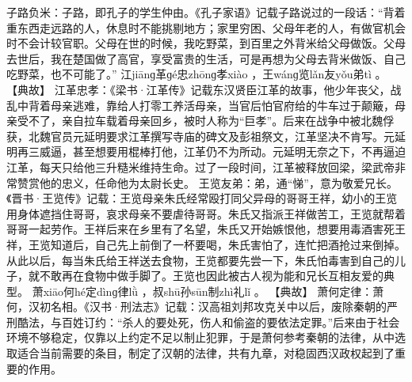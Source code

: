 \documentclass[12pt,UTF8]{ctexbook}
\begin{document}
子路负米：子路，即孔子的学生仲由。《孔子家语》记载子路说过的一段话：“背着重东西走远路的人，休息时不能挑剔地方；家里穷困、父母年老的人，有做官机会时不会计较官职。父母在世的时候，我吃野菜，到百里之外背米给父母做饭。父母去世后，我在楚国做了高官，享受富贵的生活，可是再想为父母去背米做饭、自己吃野菜，也不可能了。”
江jiānɡ革ɡé忠zhōnɡ孝xiào
，王wánɡ览lǎn友yǒu弟tì
。
【典故】
江革忠孝：《梁书·江革传》记载东汉贤臣江革的故事，他少年丧父，战乱中背着母亲逃难，靠给人打零工养活母亲，当官后怕官府给的牛车过于颠簸，母亲受不了，亲自拉车载着母亲回乡，被时人称为“巨孝”。后来在战争中被北魏俘获，北魏官员元延明要求江革撰写寺庙的碑文及彭祖祭文，江革坚决不肯写。元延明再三威逼，甚至想要用棍棒打他，江革仍不为所动。元延明无奈之下，不再逼迫江革，每天只给他三升糙米维持生命。过了一段时间，江革被释放回梁，梁武帝非常赞赏他的忠义，任命他为太尉长史。
王览友弟：弟，通“悌”，意为敬爱兄长。《晋书·王览传》记载：王览母亲朱氏经常殴打同父异母的哥哥王祥，幼小的王览用身体遮挡住哥哥，哀求母亲不要虐待哥哥。朱氏又指派王祥做苦工，王览就帮着哥哥一起劳作。王祥后来在乡里有了名望，朱氏又开始嫉恨他，想要用毒酒害死王祥，王览知道后，自己先上前倒了一杯要喝，朱氏害怕了，连忙把酒抢过来倒掉。从此以后，每当朱氏给王祥送去食物，王览都要先尝一下，朱氏怕毒害到自己的儿子，就不敢再在食物中做手脚了。王览也因此被古人视为能和兄长互相友爱的典型。
萧xiāo何hé定dìnɡ律lǜ
，叔shū孙sūn制zhì礼lǐ
。
【典故】
萧何定律：萧何，汉初名相。《汉书·刑法志》记载：汉高祖刘邦攻克关中以后，废除秦朝的严刑酷法，与百姓订约：“杀人的要处死，伤人和偷盗的要依法定罪。”后来由于社会环境不够稳定，仅靠以上约定不足以制止犯罪，于是萧何参考秦朝的法律，从中选取适合当前需要的条目，制定了汉朝的法律，共有九章，对稳固西汉政权起到了重要的作用。
\end{document}
